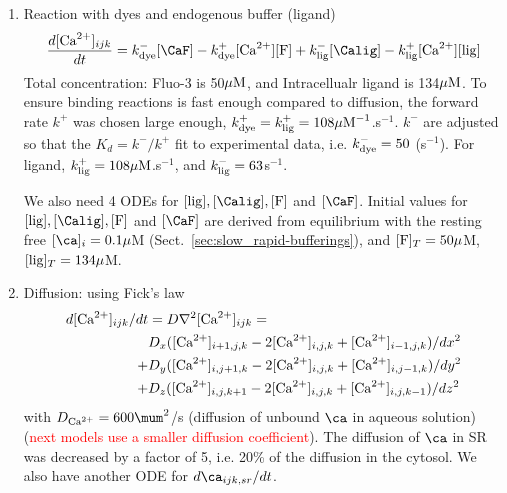 \begin{enumerate}
\item Reaction with dyes and endogenous buffer (ligand)
  \begin{equation}
    \label{eq:1036}
    \frac{d[\Ca]_{ijk}}{dt} = k^-_\dye[\CaF] - k^+_\dye[\Ca][\ce{F}] + 
    k^-_\lig[\Calig] - k^+_\lig[\Ca][\ce{lig}] 
  \end{equation}
  Total concentration: Fluo-3 is 50${\mu\text{M}}$, and Intracellualr ligand is 134${\mu\text{M}}$.
To ensure binding reactions is fast enough compared to diffusion, the forward
rate $k^+$ was chosen large enough, $k^+_{\text{dye}}=k^+_{\text{lig}}=108{\mu\text{M}}^{-1}$.s$^{-1}$.
 $k^-$ are adjusted so that the $K_d=k^-/k^+$ fit to experimental data, i.e.
$k^-_{\text{dye}}=50$ (s$^{-1}$).
For ligand, $k^+_{\text{lig}}=108 {\mu\text{M}}$.s$^{-1}$, and $k^-_{\text{lig}}=63$s$^{-1}$.
%   

  We also need 4 ODEs for $[\ce{lig}], [\Calig], [\ce{F}]$ and
  $[\CaF]$.  Initial values for $[\ce{lig}], [\Calig], [\ce{F}]$ and $[\CaF]$ are
  derived from equilibrium with the resting free $[\ca]_i=0.1\mu$M
  (Sect.~\ref{sec:slow_rapid-bufferings}), and $[\ce{F}]_T=50\mu$M,
  $[\ce{lig}]_T=134\mu$M.

\item Diffusion: using Fick's law~\citep{crank1975}
  \begin{equation}
    \label{eq:1034}
    \begin{split}
      d[{\text{Ca}^{2+}}]_{ijk}/dt &= D\nabla^2 [{\text{Ca}^{2+}}]_{ijk} = \\
      & D_x([{\text{Ca}^{2+}}]_{i+1,j,k}-2[{\text{Ca}^{2+}}]_{i,j,k}+[{\text{Ca}^{2+}}]_{i-1,j,k})/dx^2  \\
      + & D_y([{\text{Ca}^{2+}}]_{i,j+1,k}-2[{\text{Ca}^{2+}}]_{i,j,k}+[{\text{Ca}^{2+}}]_{i,j-1,k})/dy^2  \\
      + & D_z([{\text{Ca}^{2+}}]_{i,j,k+1}-2[{\text{Ca}^{2+}}]_{i,j,k}+[{\text{Ca}^{2+}}]_{i,j,k-1})/dz^2 
    \end{split}
  \end{equation}
  with $D_\Ca=600\mum^2$/s (diffusion of unbound $\ca$ in aqueous
  solution)~\citep{hodgkin1957}
  (\textcolor{red}{next models use a smaller diffusion
    coefficient}). The diffusion of $\ca$ in SR was decreased by a
    factor of 5, i.e. 20\% of the diffusion in the cytosol. We also
    have another ODE for $d\ca_{ijk,sr}/dt$.



\end{enumerate}
